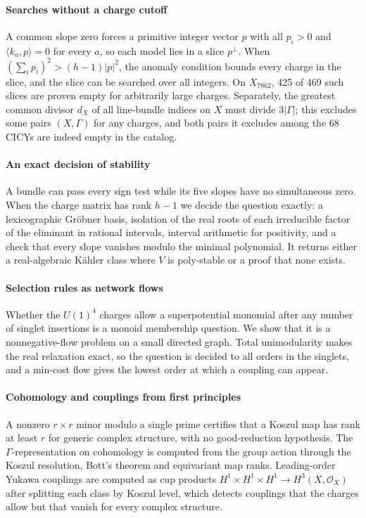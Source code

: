 \documentclass[10pt,a4paper]{article}
\newcommand{\Oc}{\mathcal{O}}
\newcommand{\Xa}{X_{7862}}
\begin{document}
\paragraph{Searches without a charge cutoff} A common slope zero forces a
primitive integer vector $p$ with all $p_i>0$ and $\langle k_a,p\rangle=0$ for
every $a$, so each model lies in a slice $p^\perp$. When
$(\sum_ip_i)^2>(h-1)|p|^2$, the anomaly condition bounds every charge in the
slice, and the slice can be searched over all integers. On $\Xa$, 425 of 469
such slices are proven empty for arbitrarily large charges. Separately, the
greatest common divisor $d_X$ of all line-bundle indices on $X$ must divide
$3|\Gamma|$; this excludes some pairs $(X,\Gamma)$ for any charges, and both
pairs it excludes among the 68 CICYs are indeed empty in the catalog.

\paragraph{An exact decision of stability} A bundle can pass every sign test
while its five slopes have no simultaneous zero. When the charge matrix has
rank $h-1$ we decide the question exactly: a lexicographic Gröbner basis,
isolation of the real roots of each irreducible factor of the eliminant in
rational intervals, interval arithmetic for positivity, and a check that every
slope vanishes modulo the minimal polynomial. It returns either a
real-algebraic Kähler class where $V$ is poly-stable or a proof that none
exists.

\paragraph{Selection rules as network flows} Whether the $U(1)^4$ charges allow
a superpotential monomial after any number of singlet insertions is a monoid
membership question. We show that it is a nonnegative-flow problem on a small
directed graph. Total unimodularity makes the real relaxation exact, so the
question is decided to all orders in the singlets, and a min-cost flow gives
the lowest order at which a coupling can appear.

\paragraph{Cohomology and couplings from first principles} A nonzero
$r\times r$ minor modulo a single prime certifies that a Koszul map has rank at
least $r$ for generic complex structure, with no good-reduction hypothesis. The
$\Gamma$-representation on cohomology is computed from the group action through
the Koszul resolution, Bott's theorem and equivariant map ranks. Leading-order
Yukawa couplings are computed as cup products
$H^1\times H^1\times H^1\to H^3(X,\Oc_X)$ \cite{BBCL16} after splitting each
class by Koszul level, which detects couplings that the charges allow but that
vanish for every complex structure.
\end{document}
